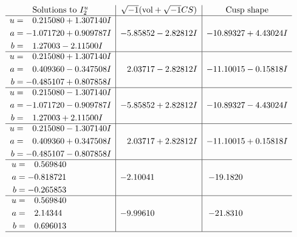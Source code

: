 \documentclass[1p]{elsarticle_modified}
\theoremstyle{definition}
\newcommand{\I}{\sqrt{-1}}
\begin{document}
$$\begin{array}{c|c|c}  
\text{Solutions to }I^u_{2}& \I (\text{vol} + \sqrt{-1}CS) & \text{Cusp shape}\\
 \hline 
\begin{aligned}
u &= \phantom{-}0.215080 + 1.307140 I \\
a &= -1.071720 + 0.909787 I \\
b &= \phantom{-}1.27003 - 2.11500 I\end{aligned}
 & -5.85852 - 2.82812 I & -10.89327 + 4.43024 I \\ \hline\begin{aligned}
u &= \phantom{-}0.215080 + 1.307140 I \\
a &= \phantom{-}0.409360 - 0.347508 I \\
b &= -0.485107 + 0.807858 I\end{aligned}
 & \phantom{-}2.03717 - 2.82812 I & -11.10015 - 0.15818 I \\ \hline\begin{aligned}
u &= \phantom{-}0.215080 - 1.307140 I \\
a &= -1.071720 - 0.909787 I \\
b &= \phantom{-}1.27003 + 2.11500 I\end{aligned}
 & -5.85852 + 2.82812 I & -10.89327 - 4.43024 I \\ \hline\begin{aligned}
u &= \phantom{-}0.215080 - 1.307140 I \\
a &= \phantom{-}0.409360 + 0.347508 I \\
b &= -0.485107 - 0.807858 I\end{aligned}
 & \phantom{-}2.03717 + 2.82812 I & -11.10015 + 0.15818 I \\ \hline\begin{aligned}
u &= \phantom{-}0.569840\phantom{ +0.000000I} \\
a &= -0.818721\phantom{ +0.000000I} \\
b &= -0.265853\phantom{ +0.000000I}\end{aligned}
 & -2.10041\phantom{ +0.000000I} & -19.1820\phantom{ +0.000000I} \\ \hline\begin{aligned}
u &= \phantom{-}0.569840\phantom{ +0.000000I} \\
a &= \phantom{-}2.14344\phantom{ +0.000000I} \\
b &= \phantom{-}0.696013\phantom{ +0.000000I}\end{aligned}
 & -9.99610\phantom{ +0.000000I} & -21.8310\phantom{ +0.000000I}\\
 \hline 
 \end{array}$$\newpage
\end{document}
